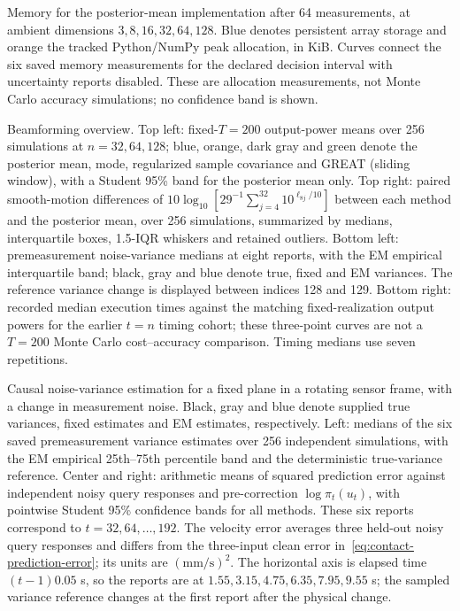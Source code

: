 \caption{Memory for the posterior-mean implementation after 64 measurements, at ambient dimensions $3,8,16,32,64,128$. Blue denotes persistent array storage and orange the tracked Python/NumPy peak allocation, in KiB. Curves connect the six saved memory measurements for the declared decision interval with uncertainty reports disabled. These are allocation measurements, not Monte Carlo accuracy simulations; no confidence band is shown.}

\caption{Beamforming overview. Top left: fixed-$T=200$ output-power means over 256 simulations at $n=32,64,128$; blue, orange, dark gray and green denote the posterior mean, mode, regularized sample covariance and GREAT (sliding window), with a Student 95\% band for the posterior mean only. Top right: paired smooth-motion differences of $10\log_{10}[29^{-1}\sum_{j=4}^{32}10^{\ell_{8j}/10}]$ between each method and the posterior mean, over 256 simulations, summarized by medians, interquartile boxes, 1.5-IQR whiskers and retained outliers. Bottom left: premeasurement noise-variance medians at eight reports, with the EM empirical interquartile band; black, gray and blue denote true, fixed and EM variances. The reference variance change is displayed between indices 128 and 129. Bottom right: recorded median execution times against the matching fixed-realization output powers for the earlier $t=n$ timing cohort; these three-point curves are not a $T=200$ Monte Carlo cost--accuracy comparison. Timing medians use seven repetitions.}

\caption{Causal noise-variance estimation for a fixed plane in a rotating sensor frame, with a change in measurement noise. Black, gray and blue denote supplied true variances, fixed estimates and EM estimates, respectively. Left: medians of the six saved premeasurement variance estimates over 256 independent simulations, with the EM empirical 25th--75th percentile band and the deterministic true-variance reference. Center and right: arithmetic means of squared prediction error against independent noisy query responses and pre-correction $\log\pi_t(u_t)$, with pointwise Student 95\% confidence bands for all methods. These six reports correspond to $t=32,64,\ldots,192$. The velocity error averages three held-out noisy query responses and differs from the three-input clean error in~\eqref{eq:contact-prediction-error}; its units are $(\mathrm{mm}/\mathrm{s})^2$. The horizontal axis is elapsed time $(t-1)0.05$ s, so the reports are at $1.55,3.15,4.75,6.35,7.95,9.55$ s; the sampled variance reference changes at the first report after the physical change.}


